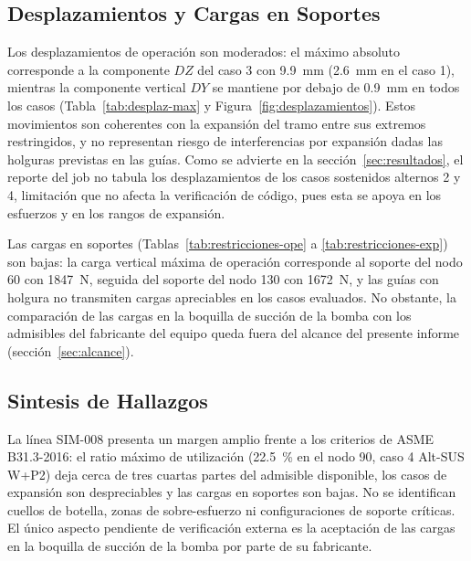 \subsection{Desplazamientos y Cargas en Soportes}

Los desplazamientos de operaci\'{o}n son moderados: el m\'{a}ximo absoluto
corresponde a la componente $DZ$ del caso 3 con 9.9~\si{mm} (2.6~\si{mm} en
el caso 1), mientras la componente vertical $DY$ se mantiene por debajo de
0.9~\si{mm} en todos los casos (Tabla~\ref{tab:desplaz-max} y
Figura~\ref{fig:desplazamientos}). Estos movimientos son coherentes con la
expansi\'{o}n del tramo entre sus extremos restringidos, y no representan
riesgo de interferencias por expansi\'{o}n dadas las holguras previstas en las
gu\'{i}as. Como se advierte en la secci\'{o}n~\ref{sec:resultados}, el reporte
del job no tabula los desplazamientos de los casos sostenidos alternos 2 y 4,
limitaci\'{o}n que no afecta la verificaci\'{o}n de c\'{o}digo, pues esta se
apoya en los esfuerzos y en los rangos de expansi\'{o}n.

Las cargas en soportes (Tablas~\ref{tab:restricciones-ope} a
\ref{tab:restricciones-exp}) son bajas: la carga vertical m\'{a}xima de
operaci\'{o}n corresponde al soporte del nodo 60 con \num{1847}~\si{N}, seguida
del soporte del nodo 130 con \num{1672}~\si{N}, y las gu\'{i}as con holgura no
transmiten cargas apreciables en los casos evaluados. No obstante, la
comparaci\'{o}n de las cargas en la boquilla de succi\'{o}n de la bomba con los
admisibles del fabricante del equipo queda fuera del alcance del presente
informe (secci\'{o}n~\ref{sec:alcance}).

\subsection{Sintesis de Hallazgos}

La l\'{i}nea SIM-008 presenta un margen amplio frente a los criterios de
ASME B31.3-2016: el ratio m\'{a}ximo de utilizaci\'{o}n (22.5~\% en el nodo
90, caso 4 Alt-SUS W+P2) deja cerca de tres cuartas partes del admisible
disponible, los casos de expansi\'{o}n son despreciables y las cargas en
soportes son bajas. No se identifican cuellos de botella, zonas de
sobre-esfuerzo ni configuraciones de soporte cr\'{i}ticas. El \'{u}nico
aspecto pendiente de verificaci\'{o}n externa es la aceptaci\'{o}n de las
cargas en la boquilla de succi\'{o}n de la bomba por parte de su fabricante.
